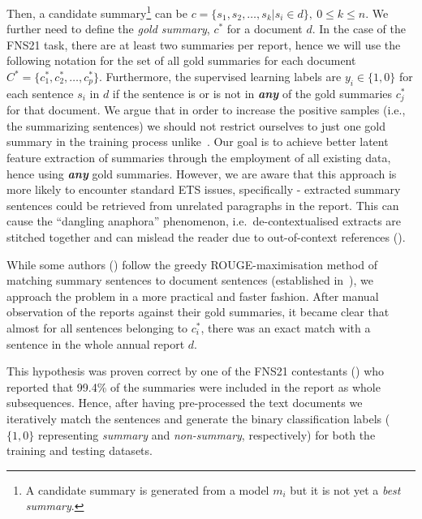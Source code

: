 Then, a candidate summary\footnote{
    A candidate summary is generated from a model $m_{i}$ but it is not yet a \emph{best summary}.
} can be $c=\{s_{1}, s_{2}, \dots, s_{k} | s_{i} \in d \}, \ 0 \leq k \leq n$.
We further need to define the \emph{gold summary}, $c^{*}$ for a document $d$.
In the case of the FNS21 task, there are at least two summaries per report, hence we will use the following notation for the set of all gold summaries for each document $C^{*} = \{c^{*}_{1}, c^{*}_{2}, \dots, c^{*}_{p}\}$.
Furthermore, the supervised learning labels are $y_{i} \in \{1,0\}$ for each sentence $s_{i}$ in $d$ if the sentence is or is not in \textbf{\emph{any}} of the gold summaries $c^{*}_{j}$ for that document.
We argue that in order to increase the positive samples (i.e., the summarizing sentences) we should not restrict
ourselves to just one gold summary in the training process unlike~\cite{orzhenovskii-2021-t5}.
Our goal is to achieve better latent feature extraction of summaries through the employment of all existing data, hence using \textbf{\emph{any}} gold summaries.
However, we are aware that this approach is more likely to encounter standard ETS issues, specifically - extracted summary sentences could be retrieved from unrelated paragraphs in the report.
This can cause the \enquote{dangling anaphora} phenomenon, i.e.\ de-contextualised extracts are stitched together and can mislead the reader due to out-of-context references (\cite{lin2009summarization}).

While some authors (\cite{zmandar-etal-2021-joint}) follow the greedy ROUGE-maximisation method of matching summary
sentences to document sentences (established in~\cite{nallapati2017summarunner}), we approach the problem in a
more practical and faster fashion.
After manual observation of the reports against their gold summaries, it became clear that almost for all sentences
belonging to $c^{*}_{i}$, there was an exact match with a sentence in the whole annual report $d$.

This hypothesis was proven correct by one of the FNS21 contestants (\cite{orzhenovskii-2021-t5}) who reported that
99.4\% of the summaries were included in the report as whole subsequences.
Hence, after having pre-processed the text documents we iteratively match the sentences and generate the binary
classification labels ($\{1,0\}$ representing \emph{summary} and \emph{non-summary}, respectively) for both
the training and testing datasets.

